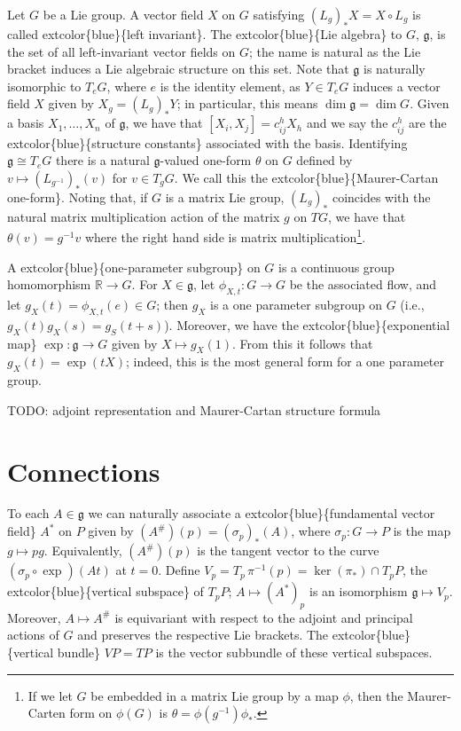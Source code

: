 \documentclass[
]{book}
\begin{document}
Let \(G\) be a Lie group.
A vector field \(X\) on \(G\) satisfying \((L_g)_* X = X \circ L_g\) is called extcolor\{blue\}\{left invariant\}.
The extcolor\{blue\}\{Lie algebra\} to \(G\), \(\mathfrak{g}\), is the set of all left-invariant vector fields on \(G\); the name is natural as the Lie bracket induces a Lie algebraic structure on this set.
Note that \(\mathfrak{g}\) is naturally isomorphic to \(T_e G\), where \(e\) is the identity element, as \(Y \in T_e G\) induces a vector field \(X\) given by \(X_g = (L_g)_* Y\); in particular, this means \(\dim \mathfrak{g} = \dim G\).
Given a basis \(X_1, \dots, X_n\) of \(\mathfrak{g}\), we have that \([X_i, X_j] = c_{ij}^h X_h\) and we say the \(c_{ij}^h\) are the extcolor\{blue\}\{structure constants\} associated with the basis.
Identifying \(\mathfrak{g} \cong T_e G\) there is a natural \(\mathfrak{g}\)-valued one-form \(\theta\) on \(G\) defined by \(v \mapsto (L_{g^{-1}})_*(v)\) for \(v \in T_g G\).
We call this the extcolor\{blue\}\{Maurer-Cartan one-form\}.
Noting that, if \(G\) is a matrix Lie group, \((L_g)_*\) coincides with the natural matrix multiplication action of the matrix \(g\) on \(TG\), we have that \(\theta(v) = g^{-1}v\) where the right hand side is matrix multiplication\footnote{If we let \(G\) be embedded in a matrix Lie group by a map \(\phi\), then the Maurer-Carten form on \(\phi(G)\) is \(\theta = \phi(g^{-1})\phi_*\).}.

A extcolor\{blue\}\{one-parameter subgroup\} on \(G\) is a continuous group homomorphism \(\mathbb{R} \to G\). For \(X \in \mathfrak{g}\), let \(\phi_{X,t} : G \to G\) be the associated flow, and let \(g_X(t) = \phi_{X,t}(e) \in G\); then \(g_X\) is a one parameter subgroup on \(G\) (i.e., \(g_X(t)g_X(s) = g_S(t+s)\)).
Moreover, we have the extcolor\{blue\}\{exponential map\} \(\exp : \mathfrak{g} \to G\) given by \(X \mapsto g_X(1)\).
From this it follows that \(g_X(t) = \exp(tX)\); indeed, this is the most general form for a one parameter group.

TODO: adjoint representation and Maurer-Cartan structure formula

\hypertarget{connections}{%
\chapter{Connections}\label{connections}}

To each \(A \in \mathfrak{g}\) we can naturally associate a extcolor\{blue\}\{fundamental vector field\} \(A^*\) on \(P\) given by \((A^\#)(p) = (\sigma_p)_*(A)\), where \(\sigma_p : G \to P\) is the map \(g \mapsto pg\). Equivalently, \((A^\#)(p)\) is the tangent vector to the curve \((\sigma_p \circ \exp)(At)\) at \(t = 0\). Define \(V_p = T_p \, \pi^{-1}(p) = \ker(\pi_*) \cap T_p P\), the extcolor\{blue\}\{vertical subspace\} of \(T_p P\); \(A \mapsto (A^*)_p\) is an isomorphism \(\mathfrak{g} \mapsto V_p\). Moreover, \(A \mapsto A^\#\) is equivariant with respect to the adjoint and principal actions of \(G\) and preserves the respective Lie brackets. The extcolor\{blue\}\{vertical bundle\} \(VP = TP\) is the vector subbundle of these vertical subspaces.
\end{document}

